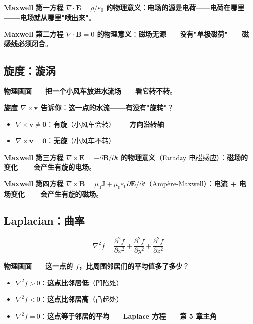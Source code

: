 \textbf{Maxwell 第一方程 $\nabla \cdot \bm{E} = \rho / \varepsilon_0$ 的物理意义}：\textbf{电场的源是电荷}——\textbf{电荷在哪里——电场就从哪里"喷出来"}。

\textbf{Maxwell 第二方程 $\nabla \cdot \bm{B} = 0$ 的物理意义}：\textbf{磁场无源}——\textbf{没有"单极磁荷"}——\textbf{磁感线必须闭合}。

\subsection{旋度：漩涡}

\textbf{物理画面}——\textbf{把一个小风车放进水流场}——\textbf{看它转不转}。

\textbf{旋度 $\nabla \times \bm{v}$ 告诉你}：\textbf{这一点的水流——有没有"旋转"}？

\begin{itemize}
\item $\nabla \times \bm{v} \neq \bm{0}$：\textbf{有旋}（小风车会转）——\textbf{方向沿转轴}
\item $\nabla \times \bm{v} = \bm{0}$：\textbf{无旋}（小风车不转）
\end{itemize}

\textbf{Maxwell 第三方程 $\nabla \times \bm{E} = -\partial \bm{B}/\partial t$ 的物理意义}（Faraday 电磁感应）：\textbf{磁场的变化——会产生有旋的电场}。

\textbf{Maxwell 第四方程 $\nabla \times \bm{B} = \mu_0 \bm{J} + \mu_0 \varepsilon_0 \partial \bm{E}/\partial t$}（Ampère-Maxwell）：\textbf{电流 + 电场变化——会产生有旋的磁场}。

\subsection{Laplacian：曲率}

\[
\nabla^2 f = \frac{\partial^2 f}{\partial x^2} + \frac{\partial^2 f}{\partial y^2} + \frac{\partial^2 f}{\partial z^2}
\]

\textbf{物理画面}——\textbf{这一点的 $f$，比周围邻居们的平均值多了多少}？

\begin{itemize}
\item $\nabla^2 f > 0$：\textbf{这点比邻居低}（凹陷处）
\item $\nabla^2 f < 0$：\textbf{这点比邻居高}（凸起处）
\item $\nabla^2 f = 0$：\textbf{这点等于邻居的平均}——\textbf{Laplace 方程}——\textbf{第 5 章主角}
\end{itemize}


